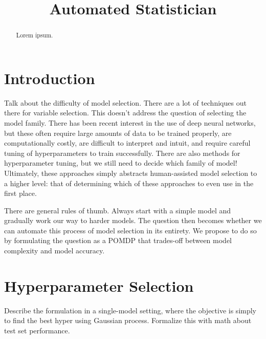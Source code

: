 \documentclass{article}
\title{Automated Statistician}
\begin{document}
 


\begin{abstract} 
Lorem ipsum.
\end{abstract} 

\section{Introduction}
Talk about the difficulty of model selection. There are a lot of techniques out there for variable selection. This doesn't address the question of selecting the model family. There has been recent interest in the use of deep neural networks, but these often require large amounts of data to be trained properly, are computationally costly, are difficult to interpret and intuit, and require careful tuning of hyperparameters to train successfully. There are also methods for hyperparameter tuning, but we still need to decide which family of model! Ultimately, these approaches simply abstracts human-assisted model selection to a higher level: that of determining which of these approaches to even use in the first place. 

There are general rules of thumb. Always start with a simple model and gradually work our way to harder models. The question then becomes whether we can automate this process of model selection in its entirety. We propose to do so by formulating the question as a POMDP that trades-off between model complexity and model accuracy.

\section{Hyperparameter Selection}
Describe the formulation in a single-model setting, where the objective is simply to find the best hyper using Gaussian process. Formalize this with math about test set performance. 
\end{document}
